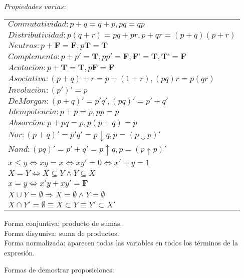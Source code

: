 \documentclass[titlepage,a4paper,12pt,twoside]{article}
\begin{document}
$Propiedades $ $ varias:$
\begin{table}[htbp]
\centering
\begin{tabular}{l}
 $Conmutatividad: p + q = q + p , pq = qp$\\ 
 $Distributividad: p(q + r) = pq + pr , p + qr = (p + q)(p + r)$\\
 $Neutros: p + \textbf{F} = \textbf{F} , p\textbf{T} = \textbf{T}$\\
 $Complemento : p + p' = \textbf{T} , pp' = \textbf{F} , \textbf{F'} = \textbf{T} , \textbf{T'} = \textbf{F} $\\
 $Acotaci\acute{o}n : p + \textbf{T} = \textbf{T} , p\textbf{F} = \textbf{F}$\\
 $Asociativa : (p + q) + r = p + (1 + r) , (pq)r = p(qr)$\\
 $Involuci\acute{o}n : (p')' = p$\\
 $De Morgan : (p + q)' = p'q' , (pq)' = p' + q'$\\
 $Idempotencia : p + p = p , pp = p$\\
 $Absorci\acute{o}n : p + pq = p , p(p + q) = p$\\
 $Nor:  (p + q)' = p'q' = p \downarrow q , p = (p \downarrow p)'$\\
 $Nand:  (pq)' = p' + q' = p \uparrow q , p = (p \uparrow p)'$\\
 $x \leqslant y \Leftrightarrow xy = x \Leftrightarrow xy' = 0 \Leftrightarrow x' + y = 1$\\
 $X = Y \Leftrightarrow X \subseteq Y \wedge Y \subseteq X $\\
 $x = y \Leftrightarrow x'y + xy' = \textbf{F}$\\
 $X \cup Y = \emptyset \Rightarrow X = \emptyset \wedge Y = \emptyset$\\
 $X \cap Y' = \emptyset \equiv X \subset Y \equiv Y' \subset X'$\\
\end{tabular}
\label{tabla}
\end{table}

\begin{flushleft}
Forma conjuntiva: producto de sumas.\\
Forma disyuniva: suma de productos.\\
Forma normalizada: aparecen todas las variables en todos los términos de la expresión.\\
\end{flushleft}

\newpage
Formas de demostrar proposiciones:
\end{document}
